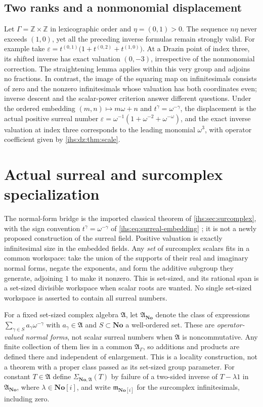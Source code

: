 \documentclass[11pt,a4paper]{article}
\numberwithin{equation}{section}
\theoremstyle{definition}
\theoremstyle{remark}
\newcommand{\Z}{\mathbb Z}
\newcommand{\No}{\mathbf{No}}
\newcommand{\eps}{\varepsilon}
\newcommand{\Alg}{\mathfrak A}
\newcommand{\AlgG}{\mathfrak A_\Gamma}
\begin{document}
\subsection{Two ranks and a nonmonomial displacement}\label{ihs:dz:sec:tworank}
Let $\Gamma=\Z\times\Z$ in lexicographic order and $\eta=(0,1)>0$. The
sequence $n\eta$ never exceeds $(1,0)$, yet all the preceding inverse
formulas remain strongly valid. For example take
$\eps=t^{(0,1)}\bigl(1+t^{(0,2)}+t^{(1,0)}\bigr)$. At a Drazin point of index
three, its shifted inverse has exact valuation $(0,-3)$, irrespective of the
nonmonomial correction. The straightening lemma applies within this very
group and adjoins no fractions. In contrast, the image of the squaring map
on infinitesimals consists of zero and the nonzero infinitesimals whose
valuation has both coordinates even; inverse descent and the scalar-power criterion answer
different questions. Under the ordered embedding $(m,n)\mapsto m\omega+n$
and $t^\gamma=\omega^{-\gamma}$, the displacement is the actual positive
surreal number $\eps=\omega^{-1}(1+\omega^{-2}+\omega^{-\omega})$, and the
exact inverse valuation at index three corresponds to the leading monomial
$\omega^3$, with operator coefficient given by \cref{ihs:dz:thm:scale}.

\section{Actual surreal and surcomplex specialization}\label{ihs:dz:sec:surreal}

The normal-form bridge is the imported classical theorem of
\cref{ihs:sec:surcomplex}, with the sign convention $t^\gamma=\omega^{-\gamma}$
of \eqref{ihs:eq:surreal-embedding} \cite{Gonshor,DriesEhrlich}; it is not a
newly proposed construction of the surreal field. Positive valuation is
exactly infinitesimal size in the embedded fields. Any \emph{set} of
surcomplex scalars fits in a common workspace: take the union of the supports
of their real and imaginary normal forms, negate the exponents, and form the
additive subgroup they generate, adjoining $1$ to make it nonzero. This is
set-sized, and its rational span is a set-sized divisible workspace when
scalar roots are wanted. No single set-sized workspace is asserted to contain
all surreal numbers.

For a fixed set-sized complex algebra $\Alg$, let $\Alg_{\No}$ denote the
class of expressions $\sum_{\gamma\in S}a_\gamma\omega^{-\gamma}$ with
$a_\gamma\in\Alg$ and $S\subset\No$ a well-ordered set. These are
\emph{operator-valued normal forms}, not scalar surreal numbers when $\Alg$ is
noncommutative. Any finite collection of them lies in a common $\AlgG$, so
additions and products are defined there and independent of enlargement.
This is a locality construction, not a theorem with a proper class passed as
its set-sized group parameter. For constant $T\in\Alg$ define
$\Sigma_{\No,\Alg}(T)$ by failure of a two-sided inverse of $T-\lambda1$ in
$\Alg_{\No}$, where $\lambda\in\No[i]$, and write $\mathfrak m_{\No[i]}$ for
the surcomplex infinitesimals, including zero.
\end{document}
